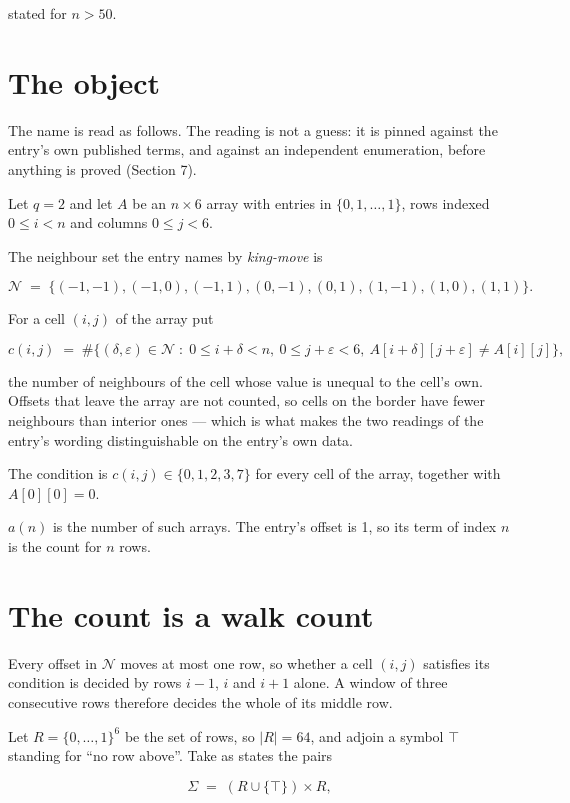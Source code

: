 \documentclass[11pt]{article}
\theoremstyle{definition}
\begin{document}
stated for $n > 50$.

\section{The object}

The name is read as follows. The reading is not a guess: it is pinned against the entry's own published terms, and against an independent enumeration, before anything is proved (Section 7).

Let $q = 2$ and let $A$ be an $n \times 6$ array with entries in $\{0,1,\dots,1\}$, rows indexed $0 \le i < n$ and columns $0 \le j < 6$.

The neighbour set the entry names by {\itshape king-move} is

\[\mathcal{N} \;=\; \{(-1,-1), (-1,0), (-1,1), (0,-1), (0,1), (1,-1), (1,0), (1,1)\}.\]

For a cell $(i,j)$ of the array put

\[c(i,j) \;=\; \#\bigl\{(\delta,\varepsilon)\in\mathcal{N} \;:\; 0\le i+\delta<n,\ 0\le j+\varepsilon<6,\ A[i+\delta][j+\varepsilon] \neq A[i][j]\bigr\},\]

the number of neighbours of the cell whose value is unequal to the cell's own. Offsets that leave the array are not counted, so cells on the border have fewer neighbours than interior ones --- which is what makes the two readings of the entry's wording distinguishable on the entry's own data.

The condition is $c(i,j) \in \{0, 1, 2, 3, 7\}$ for every cell of the array, together with $A[0][0]=0$.

$a(n)$ is the number of such arrays. The entry's offset is 1, so its term of index $n$ is the count for $n$ rows.

\section{The count is a walk count}

Every offset in $\mathcal{N}$ moves at most one row, so whether a cell $(i,j)$ satisfies its condition is decided by rows $i-1$, $i$ and $i+1$ alone. A window of three consecutive rows therefore decides the whole of its middle row.

Let $R = \{0,\dots,1\}^{6}$ be the set of rows, so $|R| = 64$, and adjoin a symbol $\top$ standing for ``no row above''. Take as states the pairs

\[\Sigma \;=\; (R \cup \{\top\}) \times R,\]
\end{document}
